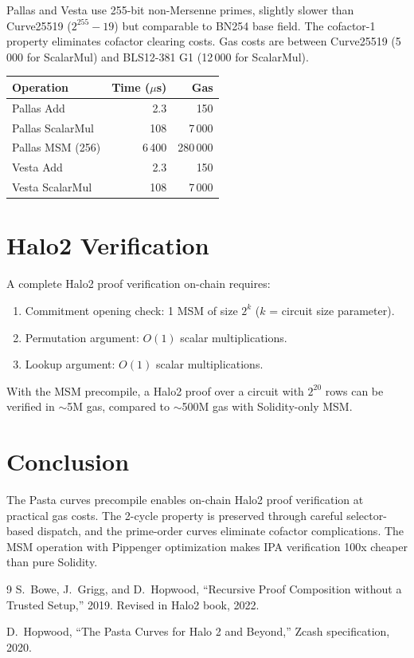 \documentclass[11pt,a4paper]{article}
\begin{document}
Pallas and Vesta use 255-bit non-Mersenne primes, slightly slower than
Curve25519 ($2^{255}-19$) but comparable to BN254 base field. The cofactor-1
property eliminates cofactor clearing costs. Gas costs are between Curve25519
(5\,000 for ScalarMul) and BLS12-381 G1 (12\,000 for ScalarMul).

\begin{table}[H]
\centering
\begin{tabular}{lrr}
\toprule
\textbf{Operation} & \textbf{Time ($\mu$s)} & \textbf{Gas} \\
\midrule
Pallas Add & 2.3 & 150 \\
Pallas ScalarMul & 108 & 7\,000 \\
Pallas MSM (256) & 6\,400 & 280\,000 \\
Vesta Add & 2.3 & 150 \\
Vesta ScalarMul & 108 & 7\,000 \\
\bottomrule
\end{tabular}
\end{table}

\section{Halo2 Verification}

A complete Halo2 proof verification on-chain requires:
\begin{enumerate}
  \item Commitment opening check: 1 MSM of size $2^k$ ($k$ = circuit size parameter).
  \item Permutation argument: $O(1)$ scalar multiplications.
  \item Lookup argument: $O(1)$ scalar multiplications.
\end{enumerate}

With the MSM precompile, a Halo2 proof over a circuit with $2^{20}$ rows
can be verified in $\sim$5M gas, compared to $\sim$500M gas with Solidity-only MSM.

\section{Conclusion}

The Pasta curves precompile enables on-chain Halo2 proof verification at
practical gas costs. The 2-cycle property is preserved through careful
selector-based dispatch, and the prime-order curves eliminate cofactor
complications. The MSM operation with Pippenger optimization makes IPA
verification 100x cheaper than pure Solidity.

\begin{thebibliography}{9}
  S.~Bowe, J.~Grigg, and D.~Hopwood, ``Recursive Proof Composition without
  a Trusted Setup,'' 2019. Revised in Halo2 book, 2022.

  D.~Hopwood, ``The Pasta Curves for Halo 2 and Beyond,'' Zcash specification, 2020.
\end{thebibliography}
\end{document}
